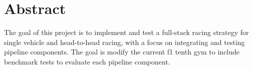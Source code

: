 \chapter{Abstract}

The goal of this project is to implement and test a full-stack racing strategy for single vehicle and head-to-head racing, with a focus on integrating and testing pipeline components. The goal is modify the current f1 tenth gym to include benchmark tests to evaluate each pipeline component.